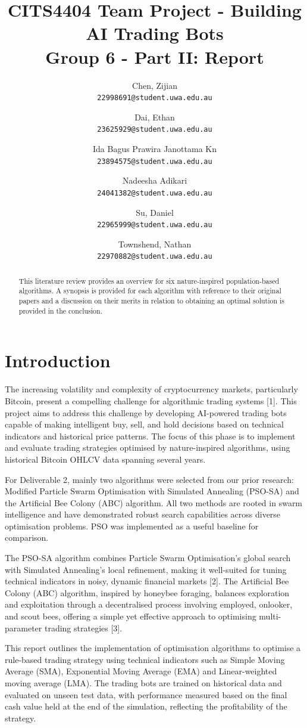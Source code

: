 \documentclass[a4paper, 12pt]{extarticle}
\title{
    CITS4404 Team Project - Building AI Trading Bots
    \\ \large Group 6 - Part II: Report
}
\author{
    Chen, Zijian\\
    \normalsize \texttt{22998691@student.uwa.edu.au}
    \and
    Dai, Ethan\\
    \normalsize \texttt{23625929@student.uwa.edu.au}
    \and
    Ida Bagus Prawira Janottama Kn\\
    \normalsize \texttt{23894575@student.uwa.edu.au}
    \and
    Nadeesha Adikari\\
    \normalsize \texttt{24041382@student.uwa.edu.au}
    \and
    Su, Daniel\\
    \normalsize \texttt{22965999@student.uwa.edu.au}
    \and
    Townshend, Nathan\\
    \normalsize \texttt{22970882@student.uwa.edu.au}
}
\date{}
\begin{document}
\maketitle

\begin{abstract}
    \noindent
    This literature review provides an overview for six nature-inspired population-based algorithms. A synopsis is provided for each algorithm with reference to their original papers and a discussion on their merits in relation to obtaining an optimal solution is provided in the conclusion.
\end{abstract}

\section{Introduction}
The increasing volatility and complexity of cryptocurrency markets, particularly Bitcoin, present a compelling challenge for algorithmic trading systems [1]. This project aims to address this challenge by developing AI-powered trading bots capable of making intelligent buy, sell, and hold decisions based on technical indicators and historical price patterns. The focus of this phase is to implement and evaluate trading strategies optimised by nature-inspired algorithms, using historical Bitcoin OHLCV data spanning several years. 

For Deliverable 2, mainly two algorithms were selected from our prior research:  Modified Particle Swarm Optimisation with Simulated Annealing (PSO-SA) and the Artificial Bee Colony (ABC) algorithm. All two methods are rooted in swarm intelligence and have demonstrated robust search capabilities across diverse optimisation problems. PSO was implemented as a useful baseline for comparison. 

The PSO-SA algorithm combines Particle Swarm Optimisation's global search with Simulated Annealing's local refinement, making it well-suited for tuning technical indicators in noisy, dynamic financial markets [2]. The Artificial Bee Colony (ABC) algorithm, inspired by honeybee foraging, balances exploration and exploitation through a decentralised process involving employed, onlooker, and scout bees, offering a simple yet effective approach to optimising multi-parameter trading strategies [3]. 

This report outlines the implementation of optimisation algorithms to optimise a rule-based trading strategy using technical indicators such as Simple Moving Average (SMA), Exponential Moving Average (EMA) and Linear-weighted moving average (LMA). The trading bots are trained on historical data and evaluated on unseen test data, with performance measured based on the final cash value held at the end of the simulation, reflecting the profitability of the strategy. 
\end{document}
